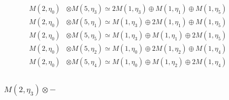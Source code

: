\begin{align*}
M(2,\eta_{0}) &\otimes M(5,\eta_{3}) \simeq 2 M(1,\eta_{3}) \oplus M(1,\eta_{1}) \oplus M(1,\eta_{5})\\
M(2,\eta_{0}) &\otimes M(5,\eta_{1}) \simeq M(1,\eta_{3}) \oplus 2 M(1,\eta_{1}) \oplus M(1,\eta_{5})\\
M(2,\eta_{0}) &\otimes M(5,\eta_{5}) \simeq M(1,\eta_{3}) \oplus M(1,\eta_{1}) \oplus 2 M(1,\eta_{5})\\
M(2,\eta_{0}) &\otimes M(5,\eta_{2}) \simeq M(1,\eta_{0}) \oplus 2 M(1,\eta_{2}) \oplus M(1,\eta_{4})\\
M(2,\eta_{0}) &\otimes M(5,\eta_{4}) \simeq M(1,\eta_{0}) \oplus M(1,\eta_{2}) \oplus 2 M(1,\eta_{4})\\
\end{align*}

\subsubsection{$ M(2,\eta_{3})\otimes -$}
